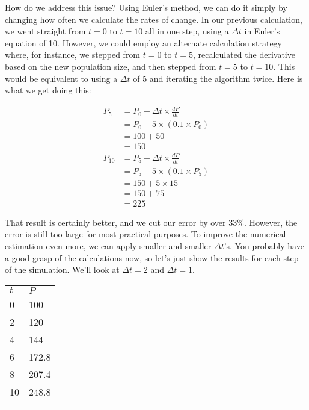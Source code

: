 \documentclass[]{memoir}
\begin{document}
How do we address this issue? Using Euler's method, we can do it simply
by changing how often we calculate the rates of change. In our previous
calculation, we went straight from $t=0$ to $t=10$ all in one step,
using a $\Delta t$ in Euler's equation of 10. However, we could employ
an alternate calculation strategy where, for instance, we stepped from
$t=0$ to $t=5$, recalculated the derivative based on the new population
size, and then stepped from $t=5$ to $t=10$. This would be equivalent to
using a $\Delta t$ of 5 and iterating the algorithm twice. Here is what
we get doing this:

\[
\begin{aligned}
P_{5} &= P_0 + \Delta t \times \frac{dP}{dt} \\
&= P_0 + 5 \times (0.1 \times P_0) \\
&= 100 + 50 \\
&= 150 \\
P_{10} &= P_5 + \Delta t \times \frac{dP}{dt} \\
&= P_5 + 5 \times (0.1 \times P_5) \\
&= 150 + 5 \times 15 \\
&= 150 + 75 \\
&= 225
\end{aligned}
\]

That result is certainly better, and we cut our error by over 33\%.
However, the error is still too large for most practical purposes. To
improve the numerical estimation even more, we can apply smaller and
smaller $\Delta t$'s. You probably have a good grasp of the calculations
now, so let's just show the results for each step of the simulation.
We'll look at $\Delta t = 2$ and $\Delta t = 1$.

\begin{longtable}[c]{@{}ll@{}}
\hline\noalign{\medskip}
$t$ & $P$
\\\noalign{\medskip}
\hline\noalign{\medskip}
0 & 100
\\\noalign{\medskip}
2 & 120
\\\noalign{\medskip}
4 & 144
\\\noalign{\medskip}
6 & 172.8
\\\noalign{\medskip}
8 & 207.4
\\\noalign{\medskip}
10 & 248.8
\\\noalign{\medskip}
\hline
\end{longtable}
\end{document}
